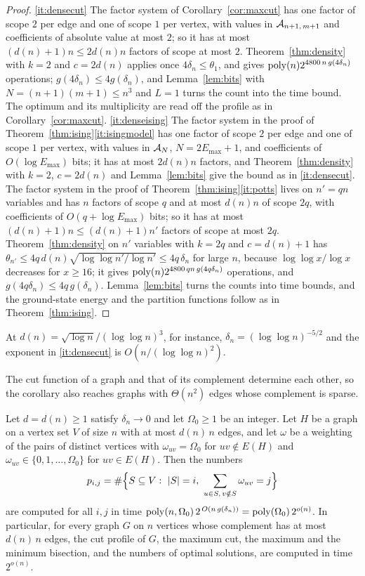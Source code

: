 \begin{proof}
\ref{it:densecut} The factor system of Corollary~\ref{cor:maxcut} has one factor
of scope $2$ per edge and one of scope $1$ per vertex, with values in
$\mathcal{A}_{n+1,\,m+1}$ and coefficients of absolute value at most $2$; so it has at
most $(d(n)+1)n\le2d(n)n$ factors of scope at most $2$. Theorem~\ref{thm:density}
with $k=2$ and $c=2d(n)$ applies once $4\delta_n\le\theta_1$, and gives
$\operatorname{poly}(n)2^{4800\,n\,g(4\delta_n)}$ operations; $g(4\delta_n)\le4g(\delta_n)$, and
Lemma~\ref{lem:bits} with $N=(n+1)(m+1)\le n^3$ and $L=1$ turns the count into the
time bound. The optimum and its multiplicity are read off the profile as in
Corollary~\ref{cor:maxcut}.
\ref{it:denseising} The factor system in the proof of Theorem~\ref{thm:ising}\ref{it:isingmodel}
has one factor of scope $2$ per edge and one of scope $1$ per vertex, with values
in $\mathcal{A}_N$, $N=2E_{\max}+1$, and coefficients of $O(\log E_{\max})$ bits; it has at
most $2d(n)n$ factors, and Theorem~\ref{thm:density} with $k=2$, $c=2d(n)$ and
Lemma~\ref{lem:bits} give the bound as in \ref{it:densecut}. The factor system
in the proof of Theorem~\ref{thm:ising}\ref{it:potts} lives on $n'=qn$ variables
and has $n$ factors of scope $q$ and at most $d(n)n$ of scope $2q$, with
coefficients of $O(q+\log E_{\max})$ bits; so it has at most
$(d(n)+1)n\le(d(n)+1)n'$ factors of scope at most $2q$. Theorem~\ref{thm:density}
on $n'$ variables with $k=2q$ and $c=d(n)+1$ has
$\theta_{n'}\le4q\,d(n)\sqrt{\log\log n'/\log n'}\le4q\,\delta_n$ for large $n$,
because $\log\log x/\log x$ decreases for $x\ge16$; it gives
$\operatorname{poly}(n)2^{4800\,qn\,g(4q\delta_n)}$ operations, and $g(4q\delta_n)\le4q\,g(\delta_n)$.
Lemma~\ref{lem:bits} turns the counts into time bounds, and the ground-state energy
and the partition functions follow as in Theorem~\ref{thm:ising}.
\end{proof}

At $d(n)=\sqrt{\log n}/(\log\log n)^3$, for instance, $\delta_n=(\log\log n)^{-5/2}$
and the exponent in \ref{it:densecut} is $O(n/(\log\log n)^2)$.

The cut function of a graph and that of its complement determine each other, so the
corollary also reaches graphs with $\Theta(n^2)$ edges whose complement is sparse.

\begin{corollary}\label{cor:complement}
Let $d=d(n)\ge1$ satisfy $\delta_n\to0$ and let $\Omega_0\ge1$ be an integer. Let
$H$ be a graph on a vertex set $V$ of size $n$ with at most $d(n)\,n$ edges, and let
$\omega$ be a weighting of the pairs of distinct vertices with $\omega_{uv}=\Omega_0$
for $uv\notin E(H)$ and $\omega_{uv}\in\{0,1,\dots,\Omega_0\}$ for $uv\in E(H)$. Then
the numbers
\[
  p_{i,j}=\#\Bigl\{S\subseteq V:\ |S|=i,\ \sum_{u\in S,\,v\notin S}\omega_{uv}=j\Bigr\}
\]
are computed for all $i,j$ in time $\operatorname{poly}(n,\Omega_0)\,2^{\,O(n\,g(\delta_n))}=\operatorname{poly}(\Omega_0)\,2^{o(n)}$.
In particular, for every graph $G$ on $n$ vertices whose complement has at most
$d(n)\,n$ edges, the cut profile of $G$, the maximum cut, the maximum and the
minimum bisection, and the numbers of optimal solutions, are computed in time
$2^{o(n)}$.
\end{corollary}

